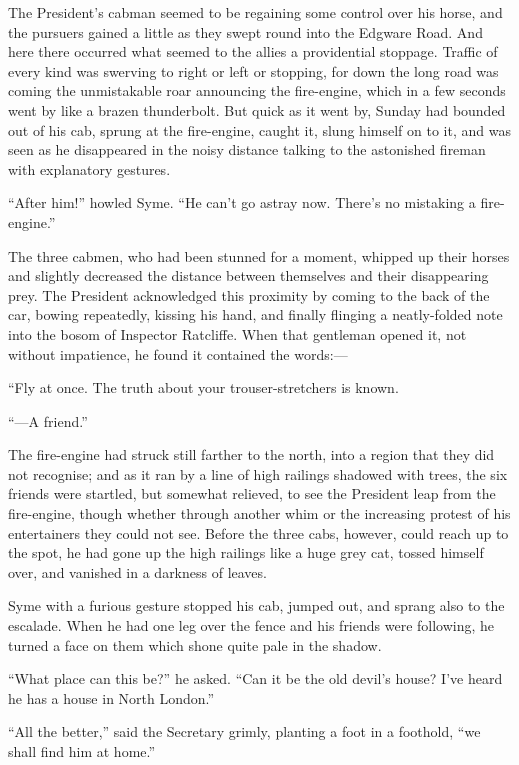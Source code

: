 The President’s cabman seemed to be regaining some control over his horse, and the pursuers gained a little as they swept round into the Edgware Road. And here there occurred what seemed to the allies a providential stoppage. Traffic of every kind was swerving to right or left or stopping, for down the long road was coming the unmistakable roar announcing the fire-engine, which in a few seconds went by like a brazen thunderbolt. But quick as it went by, Sunday had bounded out of his cab, sprung at the fire-engine, caught it, slung himself on to it, and was seen as he disappeared in the noisy distance talking to the astonished fireman with explanatory gestures.

“After him!” howled Syme. “He can’t go astray now. There’s no mistaking a fire-engine.”

The three cabmen, who had been stunned for a moment, whipped up their horses and slightly decreased the distance between themselves and their disappearing prey. The President acknowledged this proximity by coming to the back of the car, bowing repeatedly, kissing his hand, and finally flinging a neatly-folded note into the bosom of Inspector Ratcliffe. When that gentleman opened it, not without impatience, he found it contained the words:⁠—

    “Fly at once. The truth about your trouser-stretchers is known.

    “⁠—A friend.”

The fire-engine had struck still farther to the north, into a region that they did not recognise; and as it ran by a line of high railings shadowed with trees, the six friends were startled, but somewhat relieved, to see the President leap from the fire-engine, though whether through another whim or the increasing protest of his entertainers they could not see. Before the three cabs, however, could reach up to the spot, he had gone up the high railings like a huge grey cat, tossed himself over, and vanished in a darkness of leaves.

Syme with a furious gesture stopped his cab, jumped out, and sprang also to the escalade. When he had one leg over the fence and his friends were following, he turned a face on them which shone quite pale in the shadow.

“What place can this be?” he asked. “Can it be the old devil’s house? I’ve heard he has a house in North London.”

“All the better,” said the Secretary grimly, planting a foot in a foothold, “we shall find him at home.”

